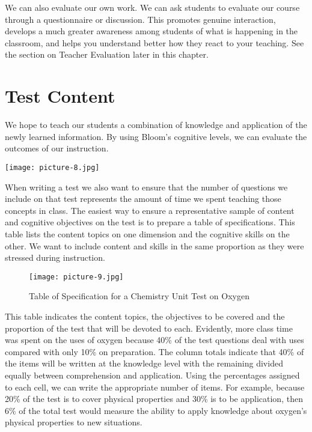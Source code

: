We can also evaluate our own work.  We can ask students to evaluate our course through a questionnaire or discussion.  This promotes genuine interaction, develops a much greater awareness among students of what is happening in the classroom, and helps you understand better how they react to your teaching. See the section on Teacher Evaluation later in this chapter.

\pagebreak
\section{Test Content}

We hope to teach our students a combination of knowledge and application of the newly learned information.  By using Bloom's cognitive levels, we can evaluate the outcomes of our instruction.

\begin{center}
\texttt{[image: picture-8.jpg]} 
\end{center}

When writing a test we also want to ensure that the number of questions we include on that test represents the amount of time we spent teaching those concepts in class.  The easiest way to ensure a representative sample of content and cognitive objectives on the test is to prepare a table of specifications. This table lists the content topics on one dimension and the cognitive skills on the other. We want to include content and skills in the same proportion as they were stressed during instruction.\\

\begin{figure}[h!]
\begin{center}
\texttt{[image: picture-9.jpg]}
\caption{Table of Specification for a Chemistry Unit Test on Oxygen}
\end{center}
\end{figure}

This table indicates the content topics, the objectives to be covered and the proportion of the test that will be devoted to each. Evidently, more class time was spent on the uses of oxygen because 40\% of the test questions deal with uses compared with only 10\% on preparation. The column totals indicate that 40\% of the items will be written at the knowledge level with the remaining divided equally between comprehension and application. Using the percentages assigned to each cell, we can write the appropriate number of items. For example, because 20\% of the test is to cover physical properties and 30\% is to be application, then 6\% of the total test would measure the ability to apply knowledge about oxygen's physical properties to new situations.\\

